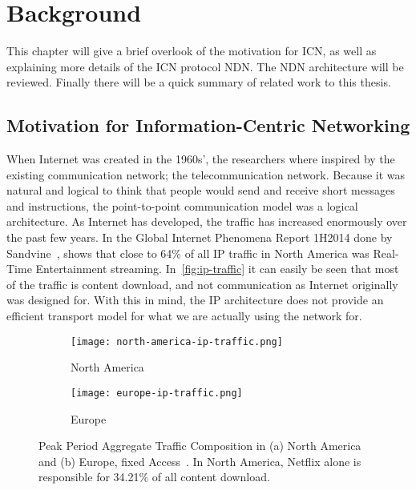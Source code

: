 \chapter{Background}\label{chp:background} 

This chapter will give a brief overlook of the motivation for \gls{ICN}, as well as explaining more details of the \gls{ICN} protocol \gls{NDN}.
The \gls{NDN} architecture will be reviewed.
Finally there will be a quick summary of related work to this thesis.

\section{Motivation for Information-Centric Networking}
When Internet was created in the 1960s', the researchers where inspired by the existing communication network; the telecommunication network.
Because it was natural and logical to think that people would send and receive short messages and instructions, the point-to-point communication model was a logical architecture. 
As Internet has developed, the traffic has increased enormously over the past few years. 
In the Global Internet Phenomena Report 1H2014 done by Sandvine~\cite{gipr2014}, shows that close to 64\% of all \gls{IP} traffic in North America was Real-Time Entertainment streaming.
In~\autoref{fig:ip-traffic} it can easily be seen that most of the traffic is content download, and not communication as Internet originally was designed for.
With this in mind, the \gls{IP} architecture does not provide an efficient transport model for what we are actually using the network for.

\begin{figure}[ht]
  \centering
  \begin{subfigure}{0.5\textwidth}
    \centering
    \texttt{[image: north-america-ip-traffic.png]}
    \caption{North America}
    \label{fig:north-america-ip-traffic}
  \end{subfigure}%
  \begin{subfigure}{0.5\textwidth}
    \centering
    \texttt{[image: europe-ip-traffic.png]}
    \caption{Europe}
    \label{fig:europe-ip-traffic}
  \end{subfigure}
  \caption[Peak Period Aggregate Traffic Composition]{
  Peak Period Aggregate Traffic Composition in (a) North America and (b) Europe, fixed Access~\cite{gipr2014}.
  In North America, Netflix alone is responsible for 34.21\% of all content download.
  }
  \label{fig:ip-traffic}
\end{figure}

